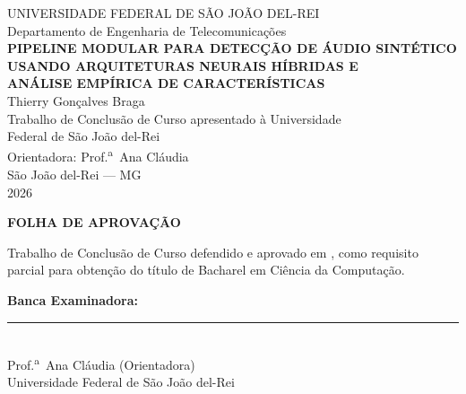 \documentclass[12pt,a4paper]{article}
\begin{document}
\pagestyle{empty}

\begin{center}
{\large UNIVERSIDADE FEDERAL DE SÃO JOÃO DEL-REI}\\[0.3cm]
{\normalsize Departamento de Engenharia de Telecomunicações}\\[2.0cm]

{\Large\bfseries
PIPELINE MODULAR PARA DETECÇÃO DE ÁUDIO SINTÉTICO\\[0.3cm]
USANDO ARQUITETURAS NEURAIS HÍBRIDAS E\\[0.3cm]
ANÁLISE EMPÍRICA DE CARACTERÍSTICAS}\\[2.0cm]

{\large Thierry Gonçalves Braga}\\[0.8cm]

{\normalsize
Trabalho de Conclusão de Curso apresentado à Universidade\\
Federal de São João del-Rei}\\[0.5cm]

{\normalsize Orientadora: Prof.\textsuperscript{a}\ Ana Cláudia}\\[3.0cm]

{\normalsize São João del-Rei --- MG\\
2026}
\end{center}

\newpage

\pagestyle{empty}
\begin{center}
\textbf{FOLHA DE APROVAÇÃO}
\end{center}

\vspace{1.5cm}
\noindent
Trabalho de Conclusão de Curso defendido e aprovado em
\underline{\hspace{4cm}}, como requisito parcial para obtenção do título de
Bacharel em Ciência da Computação.

\vspace{2cm}
\noindent\textbf{Banca Examinadora:}

\vspace{1cm}
\noindent\rule{10cm}{0.4pt}\\
Prof.\textsuperscript{a}\ Ana Cláudia (Orientadora)\\
Universidade Federal de São João del-Rei
\end{document}
